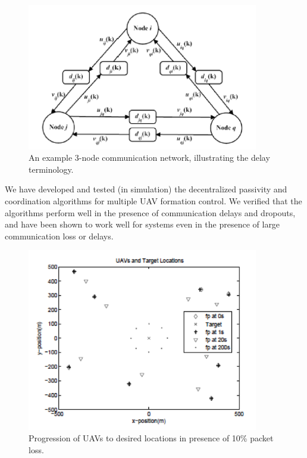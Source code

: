                \begin{figure}[thpb]
 	         \centering
	         \includegraphics[width=0.9\textwidth]{img/consensus_3nodes}
	         \caption{An example 3-node communication network, illustrating the delay terminology.}
	         \label{fig:consensus_3nodes}
               \end{figure}



We have developed and tested (in simulation) the decentralized passivity and coordination algorithms for multiple UAV formation control.   We verified that the algorithms perform well in the presence of communication delays and dropouts, and have been shown to work well for systems even in the presence of large communication loss or delays.

               \begin{figure}[thpb]
 	         \centering
	         \includegraphics[width=0.9\textwidth]{img/consensus_sim}
	         \caption{Progression of UAVs to desired locations in presence of 10\% packet loss.}
	         \label{fig:consensus_sim}
               \end{figure}



